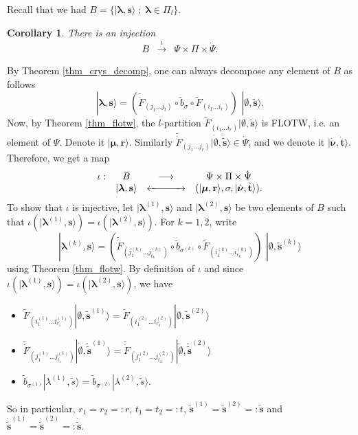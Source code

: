 \documentclass[twoside,12pt]{amsart}
\theoremstyle{plain}
\newcommand{\br}{\mathbf{r}}
\newcommand{\bs}{\mathbf{s}}
\newcommand{\bt}{\mathbf{t}}
\newcommand{\si}{\sigma}
\newcommand{\la}{\lambda}
\newcommand{\bla}{\boldsymbol{\la}}
\newcommand{\bnu}{\boldsymbol{\nu}}
\newcommand{\bmu}{\boldsymbol{\mu}}
\newcommand{\tb}{\tilde{b}}
\newcommand{\ts}{\tilde{s}}
\newcommand{\tF}{\tilde{F}}
\newcommand{\dPsi}{\dot{\Psi}}
\newcommand{\dbt}{\dot{\bt}}
\newcommand{\dbnu}{\dot{\bnu}}
\newcommand{\tdF}{\tilde{\dot{F}}}
\newcommand{\tbs}{\tilde{\bs}}
\newcommand{\dtbs}{\dot{\tbs}}
\newcommand{\lra}{\longrightarrow}
\newcommand{\bemp}{\boldsymbol{\emptyset}}
\newcommand{\dbemp}{\dot{\bemp}}
\newtheorem{cor}[num]{Corollary}
\theoremstyle{remark}
\begin{document}
\medskip

Recall that we had $B=\{ |\bla,\bs\rangle \; ; \; \bla\in\Pi_l \}$.


\begin{cor}\label{cor_param}
There is an injection
$$
\begin{array}{ccc}
B & \overset{\iota}{\longrightarrow}  & \Psi \times \Pi \times \dPsi. 
\end{array}
$$
\end{cor}

\proof
By Theorem \ref{thm_crys_decomp}, one can always decompose any element of $B$ as follows
$$|\bla,\bs\rangle = (\tdF_{(j_1 \dots j_t)} \circ \tb_{\si} \circ \tF_{(i_1 \dots i_r)}) \, \, |\bemp,\tbs\rangle.
$$
Now, by Theorem \ref{thm_flotw}, the $l$-partition $\tF_{(i_1 \dots i_r)}  |\bemp,\tbs\rangle$ is FLOTW,
i.e. an element of $\Psi$. Denote it $|\bmu,\br\rangle$.
Similarly $\tdF_{(j_1 \dots j_r)}  |\dbemp,\dtbs\rangle \in \dPsi$, and we denote it
$|\dbnu,\dbt\rangle$.
Therefore, we get a map 
$$
\begin{array}{cccc}
\iota: & B & \lra  & \Psi \times \Pi \times \dPsi \\
 & |\bla,\bs\rangle & \xleftrightarrow[]{\hspace{1.2cm}} & (|\bmu,\br\rangle,\si,|\dbnu,\dbt\rangle).
\end{array}
$$
To show that $\iota$ is injective, let $|\bla^{(1)},\bs\rangle$ and $|\bla^{(2)},\bs\rangle$ be two
elements of $B$ such that $\iota(|\bla^{(1)},\bs\rangle)=\iota(|\bla^{(2)},\bs\rangle)$.
For $k=1,2$, write $$|\bla^{(k)},\bs\rangle = (\tdF_{(j_1^{(k)} \dots j_{t_k}^{(k)})} \circ \tb_{\si^{(k)}} \circ \tF_{(i_1^{(k)} \dots i_{r_k}^{(k)})}) \, \, |\bemp,\tbs^{(k)}\rangle$$
using Theorem \ref{thm_flotw}.
By definition of $\iota$ and since $\iota(|\bla^{(1)},\bs\rangle)=\iota(|\bla^{(2)},\bs\rangle)$, we have
\begin{itemize}
\item $\tF_{(i_1^{(1)} \dots i_{r_1}^{(1)})}  |\bemp,\tbs^{(1)}\rangle=\tF_{(i_1^{(2)} \dots i_{r_2}^{(2)})}  |\bemp,\tbs^{(2)}\rangle$
\item $\tdF_{(j_1^{(1)} \dots j_{t_1}^{(1)})} |\dbemp,\dtbs^{(1)}\rangle = \tdF_{(j_1^{(2)} \dots j_{t_2}^{(2)})} |\dbemp,\dtbs^{(2)}\rangle$
\item $\tb_{\si^{(1)}} |\la^{(1)},\ts\rangle = \tb_{\si^{(2)}} |\la^{(2)},\ts\rangle$.
\end{itemize}
So in particular, $r_1=r_2=:r$, $t_1=t_2=:t$, $\tbs^{(1)}=\tbs^{(2)}=:\tbs$ and $\dtbs^{(1)}=\dtbs^{(2)}=:\dtbs$.
\end{document}
